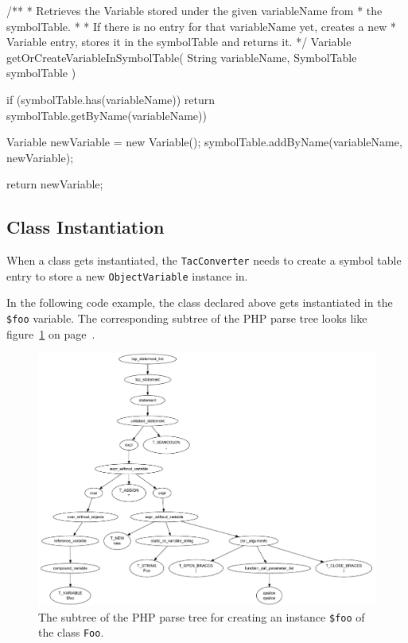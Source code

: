 \begin{textcode}
/**
 * Retrieves the Variable stored under the given variableName from
 * the symbolTable.
 *
 * If there is no entry for that variableName yet, creates a new
 * Variable entry, stores it in the symbolTable and returns it.
 */
Variable getOrCreateVariableInSymbolTable(
  String variableName, SymbolTable symbolTable
) {
  if (symbolTable.has(variableName)) {
    return symbolTable.getByName(variableName))
  }

  Variable newVariable = new Variable();
  symbolTable.addByName(variableName, newVariable);

  return newVariable;
}
\end{textcode}


\subsection{Class Instantiation}

When a class gets instantiated, the \texttt{TacConverter} needs to create a symbol table entry to store a new \texttt{ObjectVariable} instance in.

In the following code example, the class declared above gets instantiated in the \texttt{\$foo} variable. The corresponding subtree of the PHP parse tree looks like figure~\ref{fig:parse-tree-new-foo} on page~\pageref{fig:parse-tree-new-foo}.


\begin{figure}[htb]
  \begin{center}
    \includegraphics[width=\linewidth, height=.9\textheight, keepaspectratio]{images/parsetree-new-foo}
    \caption{The subtree of the PHP parse tree for creating an instance \texttt{\$foo} of the class \texttt{Foo}.}
    \label{fig:parse-tree-new-foo}
  \end{center}
\end{figure}

